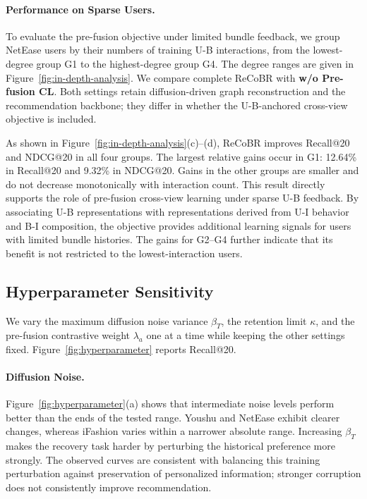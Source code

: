 \documentclass[letterpaper]{article}
\begin{document}
\paragraph{Performance on Sparse Users.}
To evaluate the pre-fusion objective under limited bundle
feedback, we group NetEase users by their numbers of training
U-B interactions, from the lowest-degree group G1 to the
highest-degree group G4. The degree ranges are given in
Figure~\ref{fig:in-depth-analysis}. We compare complete ReCoBR
with \textbf{w/o Pre-fusion CL}. Both settings retain
diffusion-driven graph reconstruction and the recommendation
backbone; they differ in whether the U-B-anchored cross-view
objective is included.

As shown in Figure~\ref{fig:in-depth-analysis}(c)--(d), ReCoBR
improves Recall@20 and NDCG@20 in all four groups. The largest
relative gains occur in G1: 12.64\% in Recall@20 and 9.32\%
in NDCG@20. Gains in the other groups are smaller and do not
decrease monotonically with interaction count. This result
directly supports the role of pre-fusion cross-view learning
under sparse U-B feedback. By associating U-B representations
with representations derived from U-I behavior and B-I
composition, the objective provides additional learning
signals for users with limited bundle histories. The gains
for G2--G4 further indicate that its benefit is not restricted
to the lowest-interaction users.


\subsection{Hyperparameter Sensitivity}

We vary the maximum diffusion noise variance $\beta_T$, the
retention limit $\kappa$, and the pre-fusion contrastive weight
$\lambda_a$ one at a time while keeping the other settings
fixed. Figure~\ref{fig:hyperparameter} reports Recall@20.

\paragraph{Diffusion Noise.}
Figure~\ref{fig:hyperparameter}(a) shows that intermediate
noise levels perform better than the ends of the tested range.
Youshu and NetEase exhibit clearer changes, whereas iFashion
varies within a narrower absolute range. Increasing $\beta_T$
makes the recovery task harder by perturbing the historical
preference more strongly. The observed curves are consistent
with balancing this training perturbation against preservation
of personalized information; stronger corruption does not
consistently improve recommendation.
\end{document}
